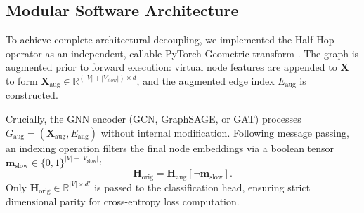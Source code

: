 \documentclass[journal]{IEEEtran}
\begin{document}
\subsection{Modular Software Architecture}
To achieve complete architectural decoupling, we implemented the Half-Hop operator as an independent, callable PyTorch Geometric transform \cite{fey2019fast}. The graph is augmented prior to forward execution: virtual node features are appended to $\mathbf{X}$ to form $\mathbf{X}_{\text{aug}} \in \mathbb{R}^{(|V| + |V_{\text{slow}}|) \times d}$, and the augmented edge index $E_{\text{aug}}$ is constructed. 

Crucially, the GNN encoder (GCN, GraphSAGE, or GAT) processes $G_{\text{aug}} = (\mathbf{X}_{\text{aug}}, E_{\text{aug}})$ without internal modification. Following message passing, an indexing operation filters the final node embeddings via a boolean tensor $\mathbf{m}_{\text{slow}} \in \{0, 1\}^{|V| + |V_{\text{slow}}|}$:
\begin{equation}
\mathbf{H}_{\text{orig}} = \mathbf{H}_{\text{aug}}[\neg \mathbf{m}_{\text{slow}}].
\label{eq:masking}
\end{equation}
Only $\mathbf{H}_{\text{orig}} \in \mathbb{R}^{|V| \times d'}$ is passed to the classification head, ensuring strict dimensional parity for cross-entropy loss computation.
\end{document}
